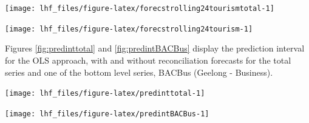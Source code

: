 \documentclass[11pt,a4paper,]{article}
\let\origfigure\figure
\let\endorigfigure\endfigure
\renewenvironment{figure}[1][2] {
    \expandafter\origfigure\expandafter[!htbp]
} {
    \endorigfigure
}
\begin{document}
\begin{figure}

{\centering \texttt{[image: lhf\_files/figure-latex/forecstrolling24tourismtotal-1]} 

}

\caption{The actual test set for the 'Total series' compared to the forecasts from reconciled and unreconciled ETS, ARIMA and OLS methods for rolling and fixed origin tourism demand.}\label{fig:forecstrolling24tourismtotal}
\end{figure}

\begin{figure}

{\centering \texttt{[image: lhf\_files/figure-latex/forecstrolling24tourism-1]} 

}

\caption{The actual test set for the 'BACBus' bottom level series compared to the forecasts from reconciled and unreconciled ETS, ARIMA and OLS methods for rolling and fixed origin tourism demand.}\label{fig:forecstrolling24tourism}
\end{figure}

Figures \ref{fig:predinttotal} and \ref{fig:predintBACBus} display the prediction interval for the OLS approach, with and without reconciliation forecasts for the total series and one of the bottom level series, BACBus (Geelong - Business).

\begin{figure}

{\centering \texttt{[image: lhf\_files/figure-latex/predinttotal-1]} 

}

\caption{The actual test set for the 'Total series' compared to the forecasts from reconciled and unreconciled OLS methods with prediction interval for fixed origin tourism demand.}\label{fig:predinttotal}
\end{figure}

\begin{figure}

{\centering \texttt{[image: lhf\_files/figure-latex/predintBACBus-1]} 

}

\caption{The actual test set for the 'BACBus' bottom level series compared to the forecasts from reconciled and unreconciled OLS methods with prediction interval for fixed origin tourism demand.}\label{fig:predintBACBus}
\end{figure}
\end{document}
